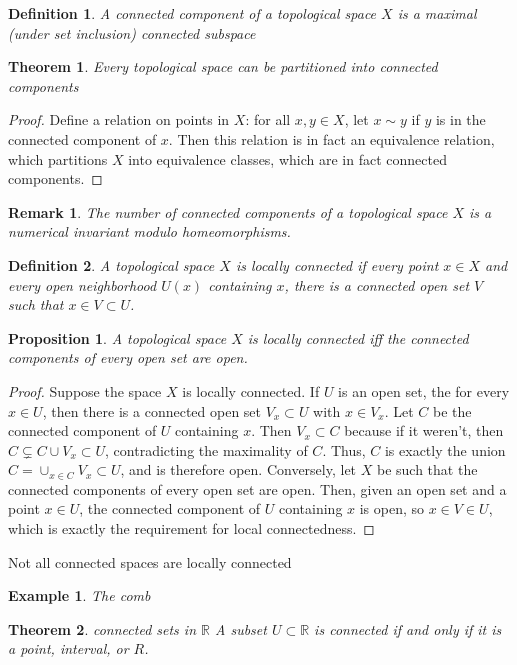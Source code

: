 \documentclass{article}
\newcommand{\R}{\mathbb{R}}
\newtheorem{theorem}{Theorem}
\newtheorem{example}{Example}
\newtheorem{remark}{Remark}
\newtheorem{proposition}{Proposition}
\newtheorem{definition}{Definition}
\begin{document}
\begin{definition}
	A \textit{connected component} of a topological space $X$ is a maximal (under set inclusion) connected subspace
\end{definition}
\begin{theorem}
	Every topological space can be partitioned into connected components
\end{theorem}
\begin{proof}
	Define a relation on points in $X$: for all $x,y \in X$, let $x\sim{y}$ if $y$ is in the connected component of $x$.  Then this relation is in fact an equivalence relation, which partitions $X$ into equivalence classes, which are in fact connected components.  
\end{proof}
\begin{remark}
	The number of connected components of a topological space $X$ is a numerical invariant modulo homeomorphisms.
\end{remark}
\begin{definition}
	A topological space $X$ is locally connected if every point $x\in X$ and every open neighborhood $U(x)$ containing $x$, there is a connected open set $V$ such that $x\in V\subset U$. 
\end{definition}
\begin{proposition}
	A topological space $X$ is locally connected iff the connected components of every open set are open.
\end{proposition}
\begin{proof}
	Suppose the space $X$ is locally connected.  If $U$ is an open set, the for every $x\in U$, then there is a connected open set $V_x\subset U$ with $x\in V_x$.  Let $C$ be the connected component of $U$ containing $x$.  Then $V_x\subset C$ because if it weren't, then $C\subsetneq C\cup V_x\subset U$, contradicting the maximality of $C$. Thus, $C$ is exactly the union $C = \cup_{x\in C}V_x \subset U$, and is therefore open.  Conversely, let $X$ be such that the connected components of every open set are open.  Then, given an open set and a point $x\in U$, the connected component of $U$ containing $x$ is open, so $x\in V\in U$, which is exactly the requirement for local connectedness. 
\end{proof}
Not all connected spaces are locally connected
\begin{example}
	The comb
\end{example}
\begin{theorem}{connected sets in $\R$}
	A subset $U\subset\R$ is connected if and only if it is a point, interval, or $R$.
\end{theorem}
\end{document}
